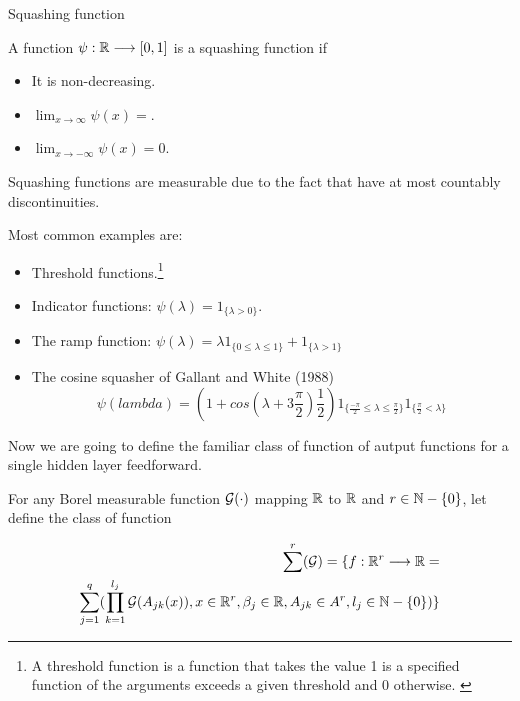 \begin{definition} Squashing function

    A function $\psi: \mathbb{R} \longrightarrow [0,1]$ is a squashing function if
    \begin{itemize}
        \item It is non-decreasing.
        \item $\lim _{x \rightarrow \infty} \psi(x) = 
        $.
        \item $\lim _{x \rightarrow -\infty} \psi(x) = 0$.
    \end{itemize}  

    Squashing functions are measurable due to the fact that have at most 
    countably discontinuities.   

    Most common examples are: 
    \begin{itemize}
        \item Threshold functions.\footnote{
         A threshold function is a function that takes the value 1 
         is a specified function of the arguments exceeds a given threshold and 
         0 otherwise. \cite{threshold-definition} 
        }

        \item Indicator functions: $\psi(\lambda) = 1_{\{\lambda > 0\}}$. 
        \item The ramp function: $\psi(\lambda)  = \lambda 1_{\{0 \leq \lambda \leq  1\}} + 1_{\{\lambda > 1\}}$
    
        \item The cosine squasher of Gallant and White (1988)
        \begin{equation*}
    \psi(lambda )= (1 + cos(\lambda + 3 \frac{\pi}{2}) \frac{1}{2}) 
     1_{\{\frac{-\pi}{2} \leq \lambda \leq  \frac{\pi}{2}\}}
     1_{\{ \frac{\pi}{2} < \lambda \}}
    \end{equation*}
    \end{itemize}
\end{definition}  

\begin{definition} 
    Now we are going to define the familiar class of function of autput functions 
    for a single hidden layer feedforward. 


    For any Borel measurable function $\mathcal{G}(\cdot)$ mapping $\mathbb{R}$ to $\mathbb{R}$ and 
    $r \in  \mathbb{N}-\{0\}$, let define the class of function 

    \begin{equation*}
        \begin{split}
        \sum ^r (\mathcal{G}) = \{ 
        f: \mathbb{R}^r \longrightarrow \mathbb{R} = \\
        \sum_{j = 1} ^q ( \prod_{k=1}^{l_j}
        \mathcal{G}(A_{jk}(x)), 
        x  \in \mathbb{R}^r, \beta_j \in \mathbb{R}, A_{jk}\in A^r, l_j \in \mathbb{N}-\{0\}
        )
        \}
    \end{split}
    \end{equation*}
    
\end{definition}


    


